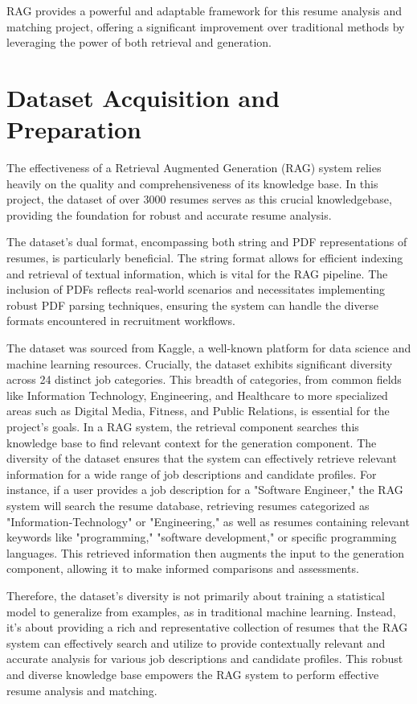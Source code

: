 \documentclass[12pt]{report}
\begin{document}
RAG provides a powerful and adaptable framework for this resume analysis and matching project, offering a significant improvement over traditional methods by leveraging the power of both retrieval and generation.

\section{Dataset Acquisition and Preparation}

The effectiveness of a Retrieval Augmented Generation (RAG) system relies heavily on the quality and comprehensiveness of its knowledge base. In this project, the dataset of over 3000 resumes serves as this crucial knowledgebase, providing the foundation for robust and accurate resume analysis.

The dataset's dual format, encompassing both string and PDF representations of resumes, is particularly beneficial. The string format allows for efficient indexing and retrieval of textual information, which is vital for the RAG pipeline. The inclusion of PDFs reflects real-world scenarios and necessitates implementing robust PDF parsing techniques, ensuring the system can handle the diverse formats encountered in recruitment workflows.

The dataset was sourced from Kaggle, a well-known platform for data science and machine learning resources. Crucially, the dataset exhibits significant diversity across 24 distinct job categories. This breadth of categories, from common fields like Information Technology, Engineering, and Healthcare to more specialized areas such as Digital Media, Fitness, and Public Relations, is essential for the project's goals. In a RAG system, the retrieval component searches this knowledge base to find relevant context for the generation component. The diversity of the dataset ensures that the system can effectively retrieve relevant information for a wide range of job descriptions and candidate profiles.
For instance, if a user provides a job description for a "Software Engineer," the RAG system will search the resume database, retrieving resumes categorized as "Information-Technology" or "Engineering," as well as resumes containing relevant keywords like "programming," "software development," or specific programming languages. This retrieved information then augments the input to the generation component, allowing it to make informed comparisons and assessments.

Therefore, the dataset's diversity is not primarily about training a statistical model to generalize from examples, as in traditional machine learning. Instead, it's about providing a rich and representative collection of resumes that the RAG system can effectively search and utilize to provide contextually relevant and accurate analysis for various job descriptions and candidate profiles. This robust and diverse knowledge base empowers the RAG system to perform effective resume analysis and matching.
\end{document}
